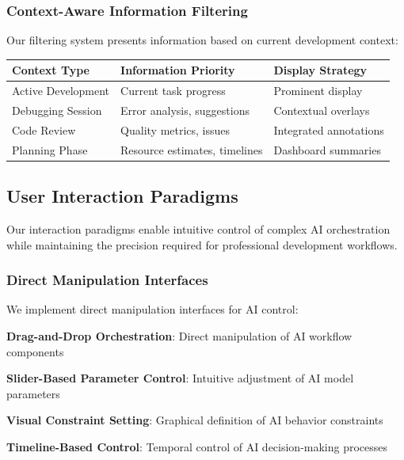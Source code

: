 \subsubsection*{Context-Aware Information Filtering}

Our filtering system presents information based on current development context:

\begin{center}
\begin{tabular}{@{}lll@{}}
\toprule
\textbf{Context Type} & \textbf{Information Priority} & \textbf{Display Strategy} \\
\midrule
Active Development & Current task progress & Prominent display \\
Debugging Session & Error analysis, suggestions & Contextual overlays \\
Code Review & Quality metrics, issues & Integrated annotations \\
Planning Phase & Resource estimates, timelines & Dashboard summaries \\
\bottomrule
\end{tabular}
\end{center}

\subsection*{User Interaction Paradigms}

Our interaction paradigms enable intuitive control of complex AI orchestration while maintaining the precision required for professional development workflows.

\subsubsection*{Direct Manipulation Interfaces}

We implement direct manipulation interfaces for AI control:

\begin{compactlist}
    \item \textbf{Drag-and-Drop Orchestration}: Direct manipulation of AI workflow components
    \item \textbf{Slider-Based Parameter Control}: Intuitive adjustment of AI model parameters
    \item \textbf{Visual Constraint Setting}: Graphical definition of AI behavior constraints
    \item \textbf{Timeline-Based Control}: Temporal control of AI decision-making processes
\end{compactlist}

